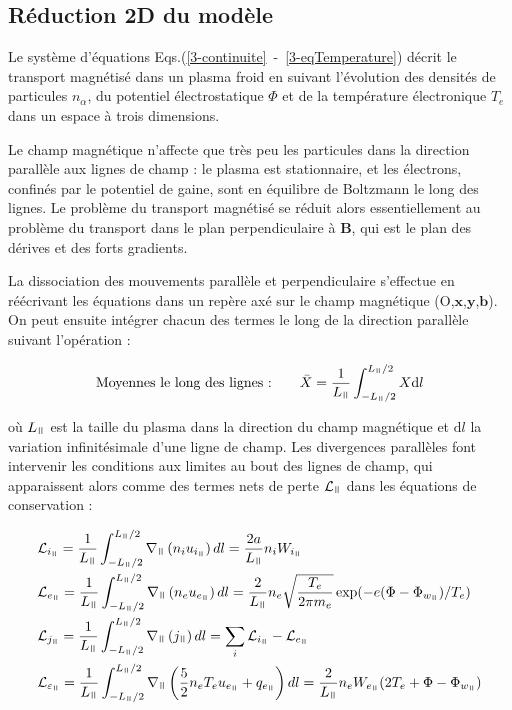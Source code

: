 \begin{refsection}
\subsection{Réduction 2D du modèle}

Le système d'équations Eqs.(\ref{3-continuite}~-~\ref{3-eqTemperature}) décrit le
transport magnétisé dans un plasma froid en suivant l'évolution des densités de
particules $n_\alpha$, du potentiel électrostatique $\Phi$ et de la
température électronique $T_e$ dans un espace à trois dimensions. 

Le champ magnétique n'affecte que très peu les particules dans la direction
parallèle aux lignes de champ : le plasma est stationnaire, et les électrons,
confinés par le potentiel de gaine, sont en équilibre de Boltzmann le long des
lignes.
Le problème du transport magnétisé se réduit alors essentiellement au problème du transport
dans le plan perpendiculaire à $\mathbf B$, qui est le plan des dérives et des
forts gradients.

La dissociation des mouvements parallèle et perpendiculaire s'effectue
en réécrivant les équations dans un repère axé sur le champ magnétique
(O,$\mathbf x$,$\mathbf y$,$\mathbf b$). On peut ensuite intégrer chacun des
termes le long de la direction parallèle suivant l'opération :

\begin{equation}
\text{Moyennes le long des lignes :\qquad}
\bar{X}=\frac{1}{L_\para}\int_{-L_\para/2}^{L_\para/2}X \text{d}l
\end{equation}

où $L_\para$ est la taille du plasma dans la direction du champ magnétique et
$\text{d}l$ la variation infinitésimale d'une ligne de champ.
Les divergences parallèles font intervenir les conditions aux limites au bout
des lignes de champ, qui apparaissent alors comme des termes nets de
perte $\mathcal L_\para$ dans les équations de conservation :

\begin{align}
\label{3-vitessesBord}
\begin{split}
\mathcal{L}&_{i_\para}=\frac{1}{L_\para}\int_{-L_\para/2}^{L_\para/2}\nabla_\para\left(n_iu_{i_\para}\right)dl=\frac{2a}{L_\para}n_iW_{i_\para}\\
\mathcal{L}&_{e_\para}=\frac{1}{L_\para}\int_{-L_\para/2}^{L_\para/2}\nabla_\para\left(n_eu_{e_\para}\right)dl=\frac{2}{L_\para}n_e\sqrt{\frac{T_e}{2\pi
m_e}}\exp(-e(\Phi-\Phi_{w_\para})/T_e)\\
\mathcal{L}&_{j_\para}=\frac{1}{L_\para}\int_{-L_\para/2}^{L_\para/2}\nabla_\para\left(j_\para\right)dl=\sum_i\mathcal{L}_{i_\para}-\mathcal{L}_{e_\para}\\
\mathcal{L}&_{\varepsilon_\para}=\frac{1}{L_\para}
\int_{-L_\para/2}^{L_\para/2}\nabla_\para
\left(\frac{5}{2}n_eT_eu_{e_\para}+q_{e_\para}\right)dl
=\frac{2}{L_\para}n_eW_{e_\para}(2T_e+\Phi-\Phi_{w_\para})
\end{split}
\end{align}


\end{refsection}
